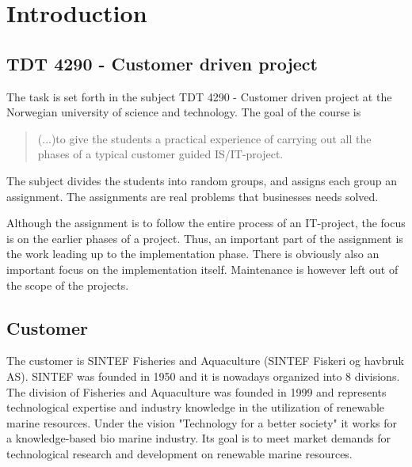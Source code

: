 \documentclass[11pt,a4paper,titlepage,oneside]{report}
\begin{document}
\tableofcontents
{}

\listoffigures
{}

\listoftables
{}

\setcounter{page}{0}


\chapter{Introduction}
\section{TDT 4290 - Customer driven project}
The task is set forth in the subject TDT 4290 - Customer driven project at the Norwegian university of science and technology. The goal of the course is 
\begin{quote}
(...)to give the students a practical experience of carrying out all the phases of a typical customer guided IS/IT-project. \cite{TDT4290:Intro}
\end{quote}
The subject divides the students into random groups, and assigns each group an assignment. The assignments are real problems that businesses needs solved. 

Although the assignment is to follow the entire process of an IT-project, the focus is on the earlier phases of a project. Thus, an important part of the assignment is the work leading up to the implementation phase. There is obviously also an important focus on the implementation itself. Maintenance is however left out of the scope of the projects.

\section{Customer}
The customer is SINTEF Fisheries and Aquaculture (SINTEF Fiskeri og havbruk AS). 
SINTEF was founded in 1950 and it is nowadays organized into 8 divisions. The division of Fisheries and Aquaculture was founded in 1999 and represents technological expertise and industry knowledge in the utilization of renewable marine resources. Under the vision "Technology for a better society" it works for a knowledge-based bio marine industry. Its goal is to meet market demands for technological research and development on renewable marine resources.
\end{document}
